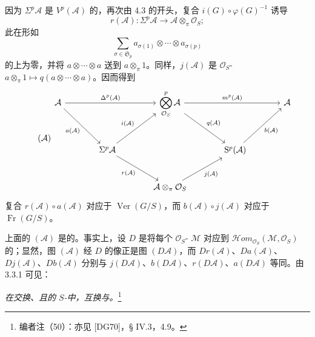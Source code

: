 因为 $\Sigma^p\mathcal A$ 是 $V^p(\mathcal A)$ 的，再次由 4.3 的开头，复合 $i(G)\circ\varphi(G)^{-1}$ 诱导
\[
r(\mathcal A):\Sigma^p\mathcal A\longrightarrow\mathcal A\otimes_\pi\mathcal O_S;
\]
此在形如
\[
\sum_{\sigma\in\mathfrak S_p}a_{\sigma(1)}\otimes\cdots\otimes a_{\sigma(p)}
\]
的上为零，并将 $a\otimes\cdots\otimes a$ 送到 $a\otimes_\pi1$。同样，$j(\mathcal A)$ 是 $\mathcal O_S$- $a\otimes_\pi1\mapsto q(a\otimes\cdots\otimes a)$。因而得到
\[
\tag{$\mathcal A$}
\begin{tikzcd}[column sep=large,row sep=large]
\mathcal A\arrow[rr,"\Delta^p(\mathcal A)"]\arrow[dr,"a(\mathcal A)"']&&\displaystyle\bigotimes_{\mathcal O_S}^p\mathcal A\arrow[rr,"m^p(\mathcal A)"]\arrow[dr,"q(\mathcal A)"]&&\mathcal A\\
&\Sigma^p\mathcal A\arrow[ur,"i(\mathcal A)"]\arrow[dr,"r(\mathcal A)"']&&\mathrm S^p(\mathcal A)\arrow[ur,"b(\mathcal A)"']&\\
&&\mathcal A\otimes_\pi\mathcal O_S\arrow[ur,"j(\mathcal A)"']&&
\end{tikzcd}
\]
复合 $r(\mathcal A)\circ a(\mathcal A)$ 对应于 $\operatorname{Ver}(G/S)$，而 $b(\mathcal A)\circ j(\mathcal A)$ 对应于 $\operatorname{Fr}(G/S)$。

上面的 $(\mathcal A)$ 是的。事实上，设 $D$ 是将每个 $\mathcal O_S$- $\mathcal M$ 对应到 $\mathcal Hom_{\mathcal O_S}(\mathcal M,\mathcal O_S)$ 的；显然，图 $(\mathcal A)$ 经 $D$ 的像正是图 $(D\mathcal A)$，而 $Dr(\mathcal A)$、$Da(\mathcal A)$、$Dj(\mathcal A)$、$Db(\mathcal A)$ 分别与 $j(D\mathcal A)$、$b(D\mathcal A)$、$r(D\mathcal A)$、$a(D\mathcal A)$ 等同。由 3.3.1 可见：

\emph{在交换、且的 $S$-中，互换与。}\footnote{编者注（50）：亦见 [DG70]，§ IV.3，4.9。}

